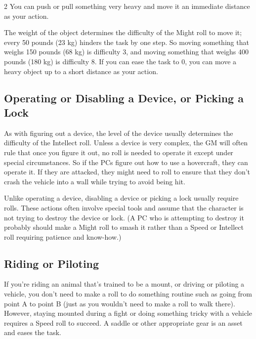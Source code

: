\begin{multicols}{2}
You can push or pull something very heavy and move it an immediate distance as your action.

The weight of the object determines the difficulty of the Might roll to move it; every 50 pounds (23 kg) hinders the task by one step. So moving something that weighs 150 pounds (68 kg) is difficulty 3, and moving something that weighs 400 pounds (180 kg) is difficulty 8. If you can ease the task to 0, you can move a heavy object up to a short distance as your action.

\subsection{Operating or Disabling a Device, or Picking a Lock}

As with figuring out a device, the level of the device usually determines the difficulty of the Intellect roll. Unless a device is very complex, the GM will often rule that once you figure it out, no roll is needed to operate it except under special circumstances. So if the PCs figure out how to use a hovercraft, they can operate it. If they are attacked, they might need to roll to ensure that they don’t crash the vehicle into a wall while trying to avoid being hit.

Unlike operating a device, disabling a device or picking a lock usually require rolls. These actions often involve special tools and assume that the character is not trying to destroy the device or lock. (A PC who is attempting to destroy it probably should make a Might roll to smash it rather than a Speed or Intellect roll requiring patience and know-how.)

\subsection{Riding or Piloting}

If you’re riding an animal that’s trained to be a mount, or driving or piloting a vehicle, you don’t need to make a roll to do something routine such as going from point A to point B (just as you wouldn’t need to make a roll to walk there). However, staying mounted during a fight or doing something tricky with a vehicle requires a Speed roll to succeed. A saddle or other appropriate gear is an asset and eases the task.

\end{multicols}

